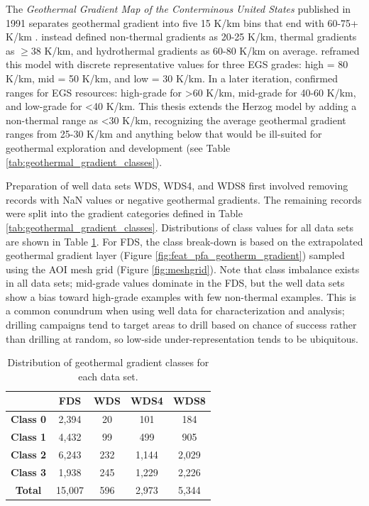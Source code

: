 The \textit{Geothermal Gradient Map of the Conterminous United States} published in 1991 separates geothermal gradient into five 15 K/km bins that end with 60-75+ K/km \citep{lanl_geothermal_1991}. \citet{armstead_heat_1987} instead defined non-thermal gradients as 20-25 K/km, thermal gradients as $\geq$38 K/km, and hydrothermal gradients as 60-80 K/km on average. \citet{tester_economic_1990} reframed this model with discrete representative values for three EGS grades: high = 80 K/km, mid = 50 K/km, and low = 30 K/km. In a later iteration, \citet{herzog_economic_1997} confirmed ranges for EGS resources: high-grade for >60 K/km, mid-grade for 40-60 K/km, and low-grade for <40 K/km. This thesis extends the Herzog model by adding a non-thermal range as <30 K/km, recognizing the average geothermal gradient ranges from 25-30 K/km and anything below that would be ill-suited for geothermal exploration and development (see Table \ref{tab:geothermal_gradient_classes}).

Preparation of well data sets WDS, WDS4, and WDS8 first involved removing records with NaN values or negative geothermal gradients. The remaining records were split into the gradient categories defined in Table \ref{tab:geothermal_gradient_classes}. Distributions of class values for all data sets are shown in Table \ref{tab:data_set_class_count}. For FDS, the class break-down is based on the extrapolated \citet{bielicki_hydrogeolgic_2015} geothermal gradient layer (Figure \ref{fig:feat_pfa_geotherm_gradient}) sampled using the AOI mesh grid (Figure \ref{fig:meshgrid}). Note that class imbalance exists in all data sets; mid-grade values dominate in the FDS, but the well data sets show a bias toward high-grade examples with few non-thermal examples. This is a common conundrum when using well data for characterization and analysis; drilling campaigns tend to target areas to drill based on chance of success rather than drilling at random, so low-side under-representation tends to be ubiquitous.  
\\
\begin{table}[htp]
\centering
\begin{tabular}{c|c|c|c|c|}
\cline{2-5}
 & \textbf{FDS} & \textbf{WDS} & \textbf{WDS4} & \textbf{WDS8} \\ \hline
\multicolumn{1}{|c|}{\textbf{Class 0}} & 2,394 & 20 & 101 & 184 \\ \hline
\multicolumn{1}{|c|}{\textbf{Class 1}} & 4,432 & 99 & 499 & 905 \\ \hline
\multicolumn{1}{|c|}{\textbf{Class 2}} & 6,243 & 232 & 1,144 & 2,029 \\ \hline
\multicolumn{1}{|c|}{\textbf{Class 3}} & 1,938 & 245 & 1,229 & 2,226 \\ \hline
\multicolumn{1}{|c|}{\textbf{Total}} & 15,007 & 596 & 2,973 & 5,344 \\ \hline
\end{tabular}
\caption[Data set class distribution]{Distribution of geothermal gradient classes for each data set.}
\label{tab:data_set_class_count}
\end{table}

